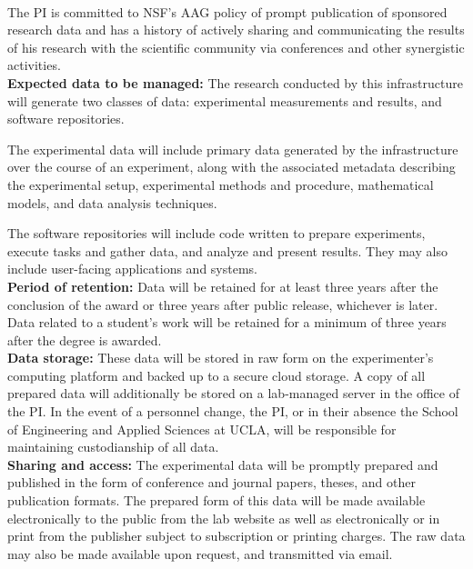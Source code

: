\\

The PI is committed to NSF's AAG policy of prompt publication of sponsored research data and has a history of actively sharing and communicating the results of his research with the scientific community via conferences and other synergistic activities. \\

\textbf{Expected data to be managed:}
The research conducted by this infrastructure will generate two classes of data: experimental measurements and results, and software repositories.  

The experimental data will include primary data generated by the infrastructure over the course of an experiment, along with the associated metadata describing the experimental setup, experimental methods and procedure, mathematical models, and data analysis techniques.  

The software repositories will include code written to prepare experiments, execute tasks and gather data, and analyze and present results.  They may also include user-facing applications and systems.   \\

\textbf{Period of retention:} 
Data will be retained for at least three years after the conclusion of the award or three years after public release, whichever is later.  Data related to a student's work will be retained for a minimum of three years after the degree is awarded.   \\

\textbf{Data storage:}
These data will be stored in raw form on the experimenter's computing platform and backed up to a secure cloud storage.  A copy of all prepared data will additionally be stored on a lab-managed server in the office of the PI.  In the event of a personnel change, the PI, or in their absence the School of Engineering and Applied Sciences at UCLA, will be responsible for maintaining custodianship of all data. \\

\textbf{Sharing and access:}
The experimental data will be promptly prepared and published in the form of conference and journal papers, theses, and other publication formats.  The prepared form of this data will be made available electronically to the public from the lab website as well as electronically or in print from the publisher subject to subscription or printing charges.  The raw data may also be made available upon request, and transmitted via email.

